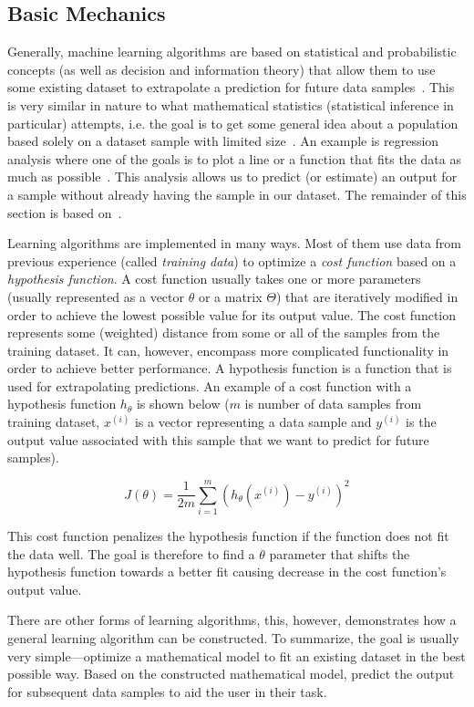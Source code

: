 \subsection{Basic Mechanics}

Generally, machine learning algorithms are based on statistical and probabilistic concepts (as well as decision and information theory) that allow them to use some existing dataset to extrapolate a prediction for future data samples~\cite{bishop2006pattern}. This is very similar in nature to what mathematical statistics (statistical inference in particular) attempts, i.e. the goal is to get some general idea about a population based solely on a dataset sample with limited size~\cite{upton2014dictionary}. An example is regression analysis where one of the goals is to plot a line or a function that fits the data as much as possible~\cite{fox1997applied}. This analysis allows us to predict (or estimate) an output for a sample without already having the sample in our dataset. The remainder of this section is based on~\cite{mitchell1997machine}.

Learning algorithms are implemented in many ways. Most of them use data from previous experience (called \textit{training data}) to optimize a \textit{cost function} based on a \textit{hypothesis function}. A cost function usually takes one or more parameters (usually represented as a vector $\theta$ or a matrix $\Theta$) that are iteratively modified in order to achieve the lowest possible value for its output value. The cost function represents some (weighted) distance from some or all of the samples from the training dataset. It can, however, encompass more complicated functionality in order to achieve better performance. A hypothesis function is a function that is used for extrapolating predictions. An example of a cost function with a hypothesis function $h_\theta$ is shown below ($m$ is number of data samples from training dataset, $x^{(i)}$ is a vector representing a data sample and $y^{(i)}$ is the output value associated with this sample that we want to predict for future samples).

$$J(\theta) = \frac{1}{2m}\sum_{i=1}^m(h_\theta(x^{(i)}) - y^{(i)})^2$$

This cost function penalizes the hypothesis function if the function does not fit the data well. The goal is therefore to find a $\theta$ parameter that shifts the hypothesis function towards a better fit causing decrease in the cost function's output value.

There are other forms of learning algorithms, this, however, demonstrates how a general learning algorithm can be constructed. To summarize, the goal is usually very simple---optimize a mathematical model to fit an existing dataset in the best possible way. Based on the constructed mathematical model, predict the output for subsequent data samples to aid the user in their task.

